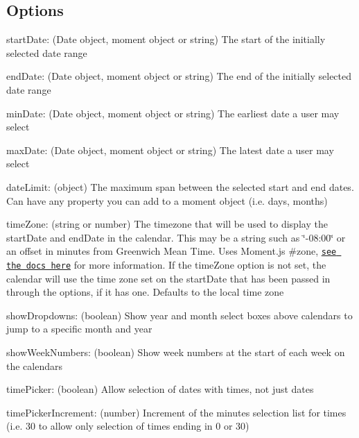 

\subsection*{Options}

{\ttfamily start\+Date}\+: (Date object, moment object or string) The start of the initially selected date range

{\ttfamily end\+Date}\+: (Date object, moment object or string) The end of the initially selected date range

{\ttfamily min\+Date}\+: (Date object, moment object or string) The earliest date a user may select

{\ttfamily max\+Date}\+: (Date object, moment object or string) The latest date a user may select

{\ttfamily date\+Limit}\+: (object) The maximum span between the selected start and end dates. Can have any property you can add to a moment object (i.\+e. days, months)

{\ttfamily time\+Zone}\+: (string or number) The timezone that will be used to display the start\+Date and end\+Date in the calendar. This may be a string such as \char`\"{}-\/08\+:00\char`\"{} or an offset in minutes from Greenwich Mean Time. Uses Moment.\+js \#zone, \href{http://momentjs.com/docs/#/manipulating/timezone-offset/}{\tt see the docs here} for more information. If the time\+Zone option is not set, the calendar will use the time zone set on the start\+Date that has been passed in through the options, if it has one. Defaults to the local time zone

{\ttfamily show\+Dropdowns}\+: (boolean) Show year and month select boxes above calendars to jump to a specific month and year

{\ttfamily show\+Week\+Numbers}\+: (boolean) Show week numbers at the start of each week on the calendars

{\ttfamily time\+Picker}\+: (boolean) Allow selection of dates with times, not just dates

{\ttfamily time\+Picker\+Increment}\+: (number) Increment of the minutes selection list for times (i.\+e. 30 to allow only selection of times ending in 0 or 30)

